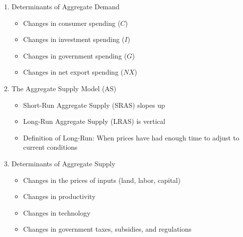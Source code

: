 \documentclass[12pt]{article}
\begin{document}
\begin{enumerate}
  \item Determinants of Aggregate Demand

    \begin{itemize}

      \item Changes in consumer spending ($C$)

      \item Changes in investment spending ($I$)

      \item Changes in government spending ($G$)

      \item Changes in net export spending ($NX$)

    \end{itemize}

  \item The Aggregate Supply Model (AS)

    \begin{itemize}

      \item Short-Run Aggregate Supply (SRAS) slopes up
        
      \item Long-Run Aggregate Supply (LRAS) is vertical

      \item Definition of Long-Run: When prices have had enough time to adjust to current conditions
        
    \end{itemize}

    \begin{center}
    \end{center}

  \item Determinants of Aggregate Supply

    \begin{itemize}

      \item Changes in the prices of inputs (land, labor, capital)

      \item Changes in productivity

      \item Changes in technology

      \item Changes in government taxes, subsidies, and regulations

    \end{itemize}

\end{enumerate}
\end{document}
